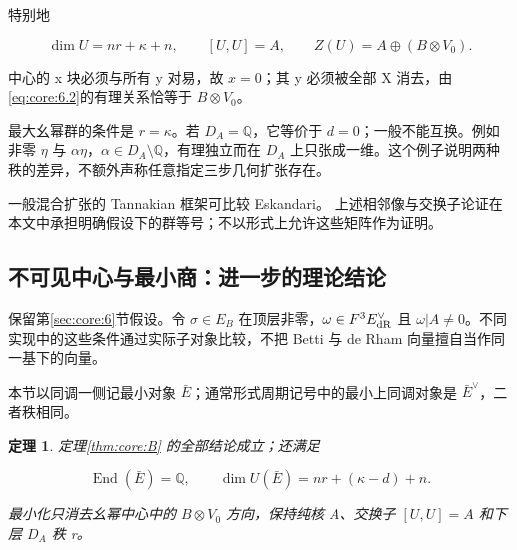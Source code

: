 \documentclass[11pt,a4paper,oneside]{ctexart}
\theoremstyle{cnplain}
\newtheorem{theorem}{定理}[section]
\theoremstyle{definition}
\theoremstyle{remark}
\numberwithin{equation}{section}
\begin{document}
特别地

\begin{equation}
\dim U=nr+\kappa+n,\qquad [U,U]=A,\qquad
 Z(U)=A\oplus(B\otimes V_0).                            \label{eq:core:6.5}
\end{equation}

中心的 x 块必须与所有 y 对易，故 \(x=0\)；其 y 必须被全部 X 消去，由\eqref{eq:core:6.2}的有理关系恰等于 \(B\otimes V_{0}\)。

最大幺幂群的条件是 \(r=\kappa \)。若 \(D_A=\mathbb Q\)，它等价于 \(d=0\)；一般不能互换。例如非零 \(\eta \) 与 \(\alpha\eta\)，\(\alpha\in D_A\setminus\mathbb Q\)，有理独立而在 \(D_A\) 上只张成一维。这个例子说明两种秩的差异，不额外声称任意指定三步几何扩张存在。

一般混合扩张的 Tannakian 框架可比较 Eskandari。\cite{eskandari} 上述相邻像与交换子论证在本文中承担明确假设下的群等号；不以形式上允许这些矩阵作为证明。


\subsection{不可见中心与最小商：进一步的理论结论}\label{sec:core:7}

保留第\ref{sec:core:6}节假设。令 \(\sigma \in E_B\) 在顶层非零，\(\omega\in F^3E_{\rm dR}^\vee\) 且 \(\omega|A\ne0\)。不同实现中的这些条件通过实际子对象比较，不把 Betti 与 de Rham 向量擅自当作同一基下的向量。

本节以同调一侧记最小对象 \(\bar E\)；通常形式周期记号中的最小上同调对象是 \(\bar E^\vee\)，二者秩相同。

\begin{theorem}

\label{thm:core:7.1} 定理\ref{thm:core:B} 的全部结论成立；还满足

\begin{equation}
\operatorname{End}(\bar E)=\mathbb Q,\qquad
 \dim U(\bar E)=nr+(\kappa-d)+n.                         \label{eq:core:7.1}
\end{equation}

最小化只消去幺幂中心中的 \(B\otimes V_{0}\) 方向，保持纯核 A、交换子 \([U,U]=A\) 和下层 \(D_A\) 秩 r。

\end{theorem}
\end{document}
